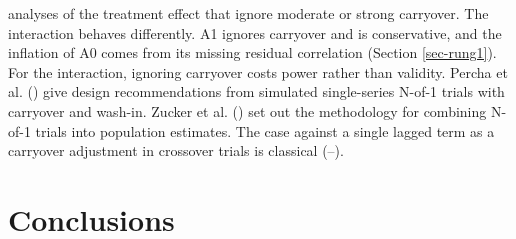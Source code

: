 \documentclass[
  11pt,
]{article}
\begin{document}
analyses of the treatment effect that ignore moderate or strong
carryover. The interaction behaves differently. A1 ignores carryover
and is conservative, and the inflation of A0 comes from its missing
residual correlation (Section \ref{sec-rung1}). For the interaction,
ignoring carryover costs power rather than validity. Percha et al.
() give design recommendations from simulated
single-series N-of-1 trials with carryover and wash-in. Zucker et
al. () set out the methodology for combining N-of-1
trials into population estimates. The case against a single lagged
term as a carryover adjustment in crossover trials is classical
(--).

\section{Conclusions}\label{sec-conclusions}
\end{document}
